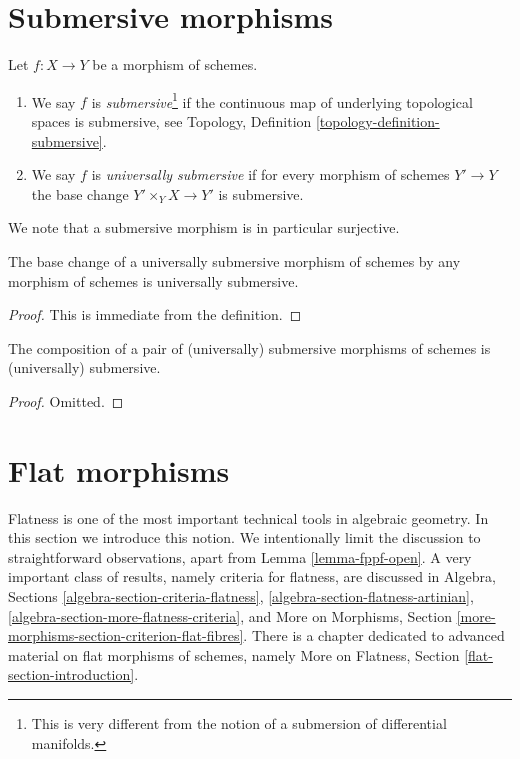 \section{Submersive morphisms}
\label{section-submersive}

\begin{definition}
\label{definition-submersive}
Let $f : X \to Y$ be a morphism of schemes.
\begin{enumerate}
\item We say $f$ is {\it submersive}\footnote{This is very different
from the notion of a submersion of differential manifolds.}
if the continuous map of underlying topological spaces is submersive, see
Topology, Definition \ref{topology-definition-submersive}.
\item We say $f$ is {\it universally submersive} if for every
morphism of schemes $Y' \to Y$ the base change
$Y' \times_Y X \to Y'$ is submersive.
\end{enumerate}
\end{definition}

\noindent
We note that a submersive morphism is in particular surjective.

\begin{lemma}
\label{lemma-base-change-universally-submersive}
The base change of a universally submersive morphism of schemes
by any morphism of schemes is universally submersive.
\end{lemma}

\begin{proof}
This is immediate from the definition.
\end{proof}

\begin{lemma}
\label{lemma-composition-universally-submersive}
The composition of a pair of (universally) submersive morphisms of
schemes is (universally) submersive.
\end{lemma}

\begin{proof}
Omitted.
\end{proof}










\section{Flat morphisms}
\label{section-flat}

\noindent
Flatness is one of the most important technical tools in algebraic geometry.
In this section we introduce this notion. We intentionally limit the discussion
to straightforward observations, apart from Lemma \ref{lemma-fppf-open}.
A very important class of results, namely criteria for flatness, are
discussed in
Algebra, Sections \ref{algebra-section-criteria-flatness},
\ref{algebra-section-flatness-artinian},
\ref{algebra-section-more-flatness-criteria}, and
More on Morphisms, Section
\ref{more-morphisms-section-criterion-flat-fibres}.
There is a chapter dedicated to advanced material on flat morphisms of
schemes, namely More on Flatness, Section \ref{flat-section-introduction}.

